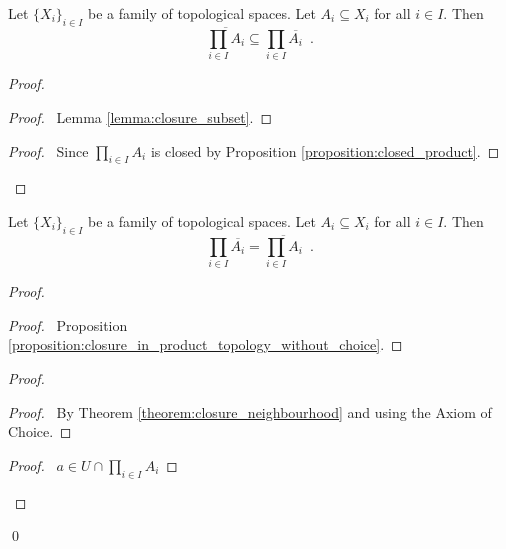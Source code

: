 \begin{proposition}[Choice]
    \label{proposition:closure_in_product_topology_without_choice}
    Let $\{ X_i \}_{i \in I}$ be a family of topological spaces. Let $A_i \subseteq X_i$ for all $i \in I$.
    Then
    \[ \overline{\prod_{i \in I} A_i} \subseteq \prod_{i \in I} \overline{A_i} \enspace . \]
\end{proposition}

\begin{proof}
    \begin{proof}
        \pf\ Lemma \ref{lemma:closure_subset}.
    \end{proof}
    \qedstep
    \begin{proof}
        \pf\ Since $\prod_{i \in I} A_i$ is closed by Proposition \ref{proposition:closed_product}.
    \end{proof}
\end{proof}

\begin{proposition}[Choice]
    \label{proposition:closure_in_product_topology}
    Let $\{ X_i \}_{i \in I}$ be a family of topological spaces. Let $A_i \subseteq X_i$ for all $i \in I$.
    Then
    \[ \prod_{i \in I} \overline{A_i} = \overline{\prod_{i \in I} A_i} \enspace . \]
\end{proposition}

\begin{proof}
    \pf
    \begin{proof}
        \pf\ Proposition \ref{proposition:closure_in_product_topology_without_choice}.
    \end{proof}
    \begin{proof}
        \begin{proof}
            \pf\ By Theorem \ref{theorem:closure_neighbourhood} and  using the Axiom of Choice.
        \end{proof}
        \qedstep
        \begin{proof}
            \pf\ $a \in U \cap \prod_{i \in I} A_i$
        \end{proof}
    \end{proof}
    \qed
\end{proof}

